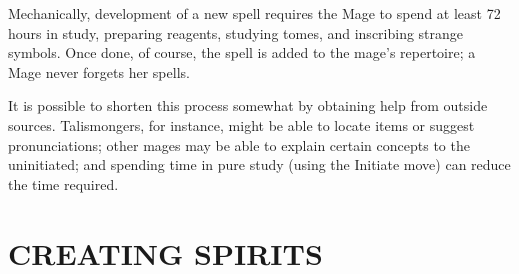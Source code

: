 \documentclass[oneside,10pt]{article}
\begin{document}
\begin{multicols}{2}
Mechanically, development of a new spell requires the Mage
to spend at least 72 hours in study, preparing reagents,
studying tomes, and inscribing strange symbols. Once done,
of course, the spell is added to the mage’s repertoire; a Mage
never forgets her spells.

It is possible to shorten this process somewhat by obtaining
help from outside sources. Talismongers, for instance, might
be able to locate items or suggest pronunciations; other mages may be able to explain certain concepts to the uninitiated;
and spending time in pure study (using the Initiate move) can
reduce the time required.

\end{multicols}


\section{CREATING SPIRITS}
\end{document}
